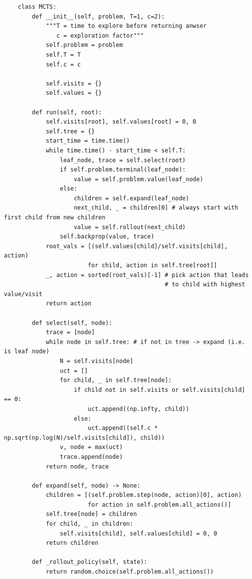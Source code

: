 \documentclass[a4paper,10pt]{article}
\begin{document}
\begin{verbatim}
    class MCTS:
        def __init__(self, problem, T=1, c=2):
            """T = time to explore before returning anwser
               c = exploration factor"""
            self.problem = problem
            self.T = T
            self.c = c
    
            self.visits = {}
            self.values = {}
        
        def run(self, root):
            self.visits[root], self.values[root] = 0, 0
            self.tree = {}
            start_time = time.time()
            while time.time() - start_time < self.T:
                leaf_node, trace = self.select(root)
                if self.problem.terminal(leaf_node):
                    value = self.problem.value(leaf_node)
                else:
                    children = self.expand(leaf_node)
                    next_child, _ = children[0] # always start with first child from new children
                    value = self.rollout(next_child)
                self.backprop(value, trace)
            root_vals = [(self.values[child]/self.visits[child], action)
                        for child, action in self.tree[root]]
            _, action = sorted(root_vals)[-1] # pick action that leads
                                              # to child with highest value/visit
            return action
        
        def select(self, node):
            trace = [node]
            while node in self.tree: # if not in tree -> expand (i.e. is leaf node)
                N = self.visits[node]
                uct = []
                for child, _ in self.tree[node]:
                    if child not in self.visits or self.visits[child] == 0:
                        uct.append((np.infty, child))
                    else:
                        uct.append((self.c * np.sqrt(np.log(N)/self.visits[child]), child))
                v, node = max(uct)
                trace.append(node)
            return node, trace
    
        def expand(self, node) -> None:
            children = [(self.problem.step(node, action)[0], action)
                        for action in self.problem.all_actions()]
            self.tree[node] = children
            for child, _ in children:
                self.visits[child], self.values[child] = 0, 0
            return children
    
        def _rollout_policy(self, state):
            return random.choice(self.problem.all_actions())
    

\end{verbatim}
\end{document}
